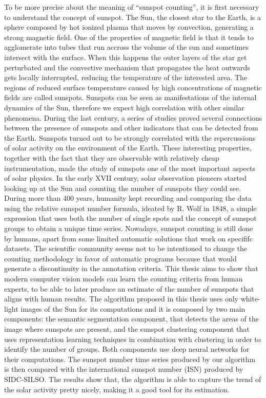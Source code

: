 \bigbreak
\noindent To be more precise about the meaning of ``sunspot counting'', it is first necessary to understand the concept of sunspot. The Sun, the closest star to the Earth, is a sphere composed by hot ionized plasma that moves by convection, generating a strong magnetic field. One of the properties of magnetic field is that it tends to agglomerate into tubes that run accross the volume of the sun and sometimes intersect with the surface. When this happens the outer layers of the star get perturbated and the convective mechanism that propagates the heat outwards gets locally interrupted, reducing the temperature of the interested area. The regions of reduced surface temperature caused by high concentrations of magnetic fields are called sunspots. Sunspots can be seen as manifestations of the internal dynamics of the Sun, therefore we expect high correlation with other similar phenomena.
\bigbreak
\noindent During the last century, a series of studies proved several connections between the presence of sunspots and other indicators that can be detected from the Earth. Sunspots turned out to be strongly correlated with the repercussions of solar activity on the environment of the Earth. These interesting properties, together with the fact that they are observable with relatively cheap instrumentation, made the study of sunspots one of the most important aspects of solar physics.
\bigbreak
\noindent In the early XVII century, solar observation pioneers started looking up at the Sun and counting the number of sunspots they could see. During more than 400 years, humanity kept recording and comparing the data using the relative sunspot number formula, ideated by R. Wolf in 1848, a simple expression that uses both the number of single spots and the concept of sunspot groups to obtain a unique time series. Nowadays, sunspot counting is still done by humans, apart from some limited automatic solutions that work on specififc datasets. The scientific community seems not to be intentioned to change the counting methodology in favor of automatic programs because that would generate a discontinuity in the annotation criteria. This thesis aims to show that modern computer vision models can learn the counting criteria from human experts, to be able to later produce an estimate of the number of sunspots that aligns with human results.
\bigbreak
\noindent The algorithm proposed in this thesis uses only white-light images of the Sun for its computations and it is composed by two main components: the semantic segmentation component, that detects the areas of the image where sunspots are present, and the sunspot clustering component that uses representation learning techniques in combination with clustering in order to identify the number of groups. Both components use deep neural networks for their computations. The sunspot number time series produced by our algorithm is then compared with the international sunspot number (ISN) produced by SIDC-SILSO. The results show that, the algorithm is able to capture the trend of the solar activity pretty nicely, making it a good tool for its estimation.
